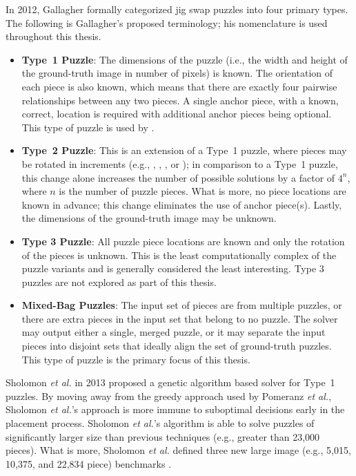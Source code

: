 In 2012, Gallagher \cite{gallagher2012} formally categorized jig swap puzzles into four primary types.  The following is Gallagher's proposed terminology; his nomenclature is used throughout this thesis.

\begin{itemize}

	\item \textbf{Type~1 Puzzle}: The dimensions of the puzzle (i.e., the width and height of the ground-truth image in number of pixels) is known.  The orientation of each piece is also known, which means that there are exactly four pairwise relationships between any two pieces.  A single anchor piece, with a known, correct, location is required with additional anchor pieces being optional.  This type of puzzle is used by \cite{cho2010, pomeranz2011}.
	
	\item \textbf{Type~2 Puzzle}: This is an extension of a Type~1 puzzle, where pieces may be rotated in  increments (e.g., , , , or ); in comparison to a Type~1 puzzle, this change alone increases the number of possible solutions by a factor of $4^n$, where $n$ is the number of puzzle pieces.  What is more, no piece locations are known in advance; this change eliminates the use of anchor piece(s).  Lastly, the dimensions of the ground-truth image may be unknown.
	
	\item \textbf{Type 3 Puzzle}: All puzzle piece locations are known and only the rotation of the pieces is unknown.  This is the least computationally complex of the puzzle variants and is generally considered the least interesting.  Type 3 puzzles are not explored as part of this thesis.
	
	\item \textbf{Mixed-Bag Puzzles}: The input set of pieces are from multiple puzzles, or there are extra pieces in the input set that belong to no puzzle.  The solver may output either a single, merged puzzle, or it may separate the input pieces into disjoint sets that ideally align the set of ground-truth puzzles.  This type of puzzle is the primary focus of this thesis.

\end{itemize}

Sholomon \textit{et al.} \cite{sholomon2013} in 2013 proposed a genetic algorithm based solver for Type~1 puzzles.  By moving away from the greedy approach used by Pomeranz \textit{et al.}, Sholomon \textit{et al.}'s approach is more immune to suboptimal decisions early in the placement process. Sholomon \textit{et al.}'s algorithm is able to solve puzzles of significantly larger size than previous techniques (e.g., greater than 23,000 pieces).  What is more, Sholomon \textit{et al.} defined three new large image (e.g., 5,015, 10,375, and 22,834 piece) benchmarks \cite{sholomonBenchmarkImages}.

